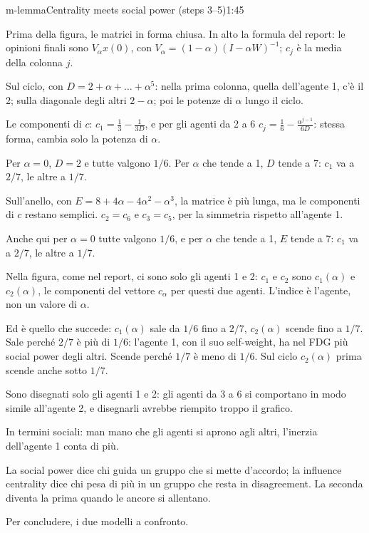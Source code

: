 \begin{slidecontinua}{m-lemma}{Centrality meets social power (steps 3--5)}{1:45}
  \begin{discorso}
    \item {} Prima della figura, le matrici in forma chiusa. In alto la formula del report: le opinioni finali sono $V_\alpha x(0)$, con $V_\alpha=(1-\alpha)(I-\alpha W)^{-1}$; $c_j$ è la media della colonna $j$.
    \item Sul ciclo, con $D=2+\alpha+\dots+\alpha^5$: nella prima colonna, quella dell'agente 1, c'è il 2; sulla diagonale degli altri $2-\alpha$; poi le potenze di $\alpha$ lungo il ciclo.
    \item Le componenti di $c$: $c_1=\frac13-\frac{1}{3D}$, e per gli agenti da 2 a 6 $c_j=\frac16-\frac{\alpha^{j-1}}{6D}$: stessa forma, cambia solo la potenza di $\alpha$.
    \item Per $\alpha=0$, $D=2$ e tutte valgono $1/6$. Per $\alpha$ che tende a 1, $D$ tende a 7: $c_1$ va a $2/7$, le altre a $1/7$.
    \item {} Sull'anello, con $E=8+4\alpha-4\alpha^2-\alpha^3$, la matrice è più lunga, ma le componenti di $c$ restano semplici. $c_2=c_6$ e $c_3=c_5$, per la simmetria rispetto all'agente 1.
    \item Anche qui per $\alpha=0$ tutte valgono $1/6$, e per $\alpha$ che tende a 1, $E$ tende a 7: $c_1$ va a $2/7$, le altre a $1/7$.
    \item {} Nella figura, come nel report, ci sono solo gli agenti 1 e 2: $c_1$ e $c_2$ sono $c_1(\alpha)$ e $c_2(\alpha)$, le componenti del vettore $c_\alpha$ per questi due agenti. L'indice è l'agente, non un valore di $\alpha$.
    \item Ed è quello che succede: $c_1(\alpha)$ sale da $1/6$ fino a $2/7$, $c_2(\alpha)$ scende fino a $1/7$. Sale perché $2/7$ è più di $1/6$: l'agente 1, con il suo self-weight, ha nel FDG più social power degli altri. Scende perché $1/7$ è meno di $1/6$. Sul ciclo $c_2(\alpha)$ prima scende anche sotto $1/7$.
    \item Sono disegnati solo gli agenti 1 e 2: gli agenti da 3 a 6 si comportano in modo simile all'agente 2, e disegnarli avrebbe riempito troppo il grafico.
    \item In termini sociali: man mano che gli agenti si aprono agli altri, l'inerzia dell'agente 1 conta di più.
    \item La social power dice chi guida un gruppo che si mette d'accordo; la influence centrality dice chi pesa di più in un gruppo che resta in disagreement. La seconda diventa la prima quando le ancore si allentano.
    \item Per concludere, i due modelli a confronto.
  \end{discorso}
\end{slidecontinua}


